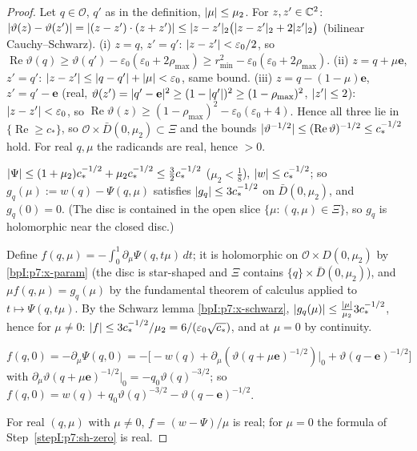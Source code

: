 \begin{proof}
\label{stepI:p7:sh-pos} Let $q\in\mathcal O$, $q'$ as in the definition, $\lvert \mu\rvert\le\mu_2$. For $z,z'\in\mathbb{C}^2$: $\lvert \vartheta(z)-\vartheta(z')\rvert=\lvert (z-z')\cdot(z+z')\rvert\le\lvert z-z'\rvert_2\bigl(\lvert z-z'\rvert_2+2\lvert z'\rvert_2\bigr)$ (bilinear Cauchy--Schwarz).
(i) $z=q$, $z'=q'$: $\lvert z-z'\rvert<\varepsilon_0/2$, so $\operatorname{Re}\vartheta(q)\ge\vartheta(q')-\varepsilon_0(\varepsilon_0+2\rho_{\max})\ge r_{\min}^2-\varepsilon_0(\varepsilon_0+2\rho_{\max})$.
(ii) $z=q+\mu\mathbf e$, $z'=q'$: $\lvert z-z'\rvert\le\lvert q-q'\rvert+\lvert \mu\rvert<\varepsilon_0$, same bound.
(iii) $z=q-(1-\mu)\mathbf e$, $z'=q'-\mathbf e$ (real, $\vartheta(z')=\lvert q'-\mathbf e\rvert^2\ge(1-\lvert q'\rvert)^2\ge(1-\rho_{\max})^2$, $\lvert z'\rvert\le2$): $\lvert z-z'\rvert<\varepsilon_0$, so $\operatorname{Re}\vartheta(z)\ge(1-\rho_{\max})^2-\varepsilon_0(\varepsilon_0+4)$.
Hence all three lie in $\{\operatorname{Re}\ge c_*\}$, so $\mathcal O\times\bar D(0,\mu_2)\subset\Xi$ and the bounds $\lvert \vartheta^{-1/2}\rvert\le(\operatorname{Re}\vartheta)^{-1/2}\le c_*^{-1/2}$ hold. For real $q,\mu$ the radicands are real, hence $>0$.

\label{stepI:p7:sh-bound} $\lvert \Psi\rvert\le(1+\mu_2)c_*^{-1/2}+\mu_2c_*^{-1/2}\le\tfrac32c_*^{-1/2}$ ($\mu_2<\tfrac18$), $\lvert w\rvert\le c_*^{-1/2}$; so $g_q(\mu):=w(q)-\Psi(q,\mu)$ satisfies $\lvert g_q\rvert\le3c_*^{-1/2}$ on $\bar D(0,\mu_2)$, and $g_q(0)=0$. (The disc is contained in the open slice $\{\mu:(q,\mu)\in\Xi\}$, so $g_q$ is holomorphic near the closed disc.)

\label{stepI:p7:sh-div} Define $f(q,\mu)=-\int_0^1\partial_\mu\Psi(q,t\mu)\,dt$; it is holomorphic on $\mathcal O\times D(0,\mu_2)$ by \ref{bpI:p7:x-param} (the disc is star-shaped and $\Xi$ contains $\{q\}\times\bar D(0,\mu_2)$), and $\mu f(q,\mu)=g_q(\mu)$ by the fundamental theorem of calculus applied to $t\mapsto\Psi(q,t\mu)$. By the Schwarz lemma \ref{bpI:p7:x-schwarz}, $\lvert g_q(\mu)\rvert\le\frac{\lvert \mu\rvert}{\mu_2}3c_*^{-1/2}$, hence for $\mu\ne0$: $\lvert f\rvert\le3c_*^{-1/2}/\mu_2=6/(\varepsilon_0\sqrt{c_*})$, and at $\mu=0$ by continuity.

\label{stepI:p7:sh-zero} $f(q,0)=-\partial_\mu\Psi(q,0)=-\bigl[-w(q)+\partial_\mu(\vartheta(q+\mu\mathbf e)^{-1/2})|_0+\vartheta(q-\mathbf e)^{-1/2}\bigr]$ with $\partial_\mu\vartheta(q+\mu\mathbf e)^{-1/2}|_0=-q_0\vartheta(q)^{-3/2}$; so $f(q,0)=w(q)+q_0\vartheta(q)^{-3/2}-\vartheta(q-\mathbf e)^{-1/2}$.

\label{stepI:p7:sh-real} For real $(q,\mu)$ with $\mu\ne0$, $f=(w-\Psi)/\mu$ is real; for $\mu=0$ the formula of Step~\ref{stepI:p7:sh-zero} is real.
\end{proof}

